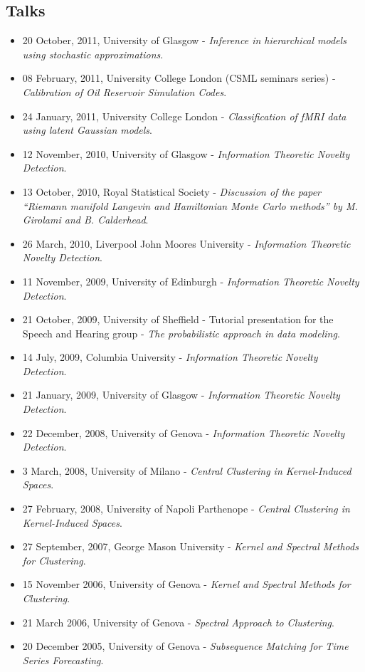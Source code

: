 \documentclass[a4paper,10pt]{article}
\begin{document}
\subsection*{Talks}
\begin{itemize}
\item 20 October, 2011, University of Glasgow - \emph{Inference in hierarchical models using stochastic approximations}.
\item 08 February, 2011, University College London (CSML seminars series) - \emph{Calibration of Oil Reservoir Simulation Codes}.
\item 24 January, 2011, University College London - \emph{Classification of fMRI data using latent Gaussian models}.
\item 12 November, 2010, University of Glasgow - \emph{Information Theoretic Novelty Detection}.
\item 13 October, 2010, Royal Statistical Society - \emph{Discussion of the paper ``Riemann manifold Langevin and Hamiltonian Monte Carlo methods'' by M. Girolami and B. Calderhead}.
\item 26 March, 2010, Liverpool John Moores University - \emph{Information Theoretic Novelty Detection}.
\item 11 November, 2009, University of Edinburgh - \emph{Information Theoretic Novelty Detection}.
\item 21 October, 2009, University of Sheffield - Tutorial presentation for the Speech and Hearing group - \emph{The probabilistic approach in data modeling}.
\item 14 July, 2009, Columbia University - \emph{Information Theoretic Novelty Detection}.
\item 21 January, 2009, University of Glasgow - \emph{Information Theoretic Novelty Detection}.
\item 22 December, 2008, University of Genova - \emph{Information Theoretic Novelty Detection}.
\item 3 March, 2008, University of Milano - \emph{Central Clustering in Kernel-Induced Spaces}.
\item 27 February, 2008, University of Napoli Parthenope - \emph{Central Clustering in Kernel-Induced Spaces}.
\item 27 September, 2007, George Mason University - \emph{Kernel and Spectral Methods for Clustering}.
\item 15 November 2006, University of Genova - \emph{Kernel and Spectral Methods for Clustering}.
\item 21 March 2006, University of Genova - \emph{Spectral Approach to Clustering}.
\item 20 December 2005, University of Genova - \emph{Subsequence Matching for Time Series Forecasting}.
\end{itemize}
\end{document}
